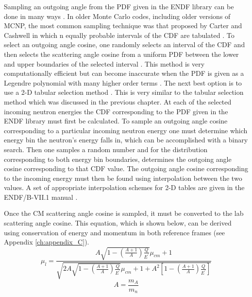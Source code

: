 Sampling an outgoing angle from the PDF given in the ENDF library can be done 
in many ways \citep{lux_monte_1991}. In older Monte Carlo codes, including older
versions of MCNP, the most common sampling technique was that proposed by 
Carter and Cashwell in which n equally probable intervals of the CDF are 
tabulated \citep{l._l._particle-transport_1975}. To select an outgoing angle 
cosine, one randomly selects an interval of the CDF and then selects the 
scattering angle cosine from a uniform PDF between the lower and upper 
boundaries of the selected interval \citep{lux_monte_1991}. This method is very 
computationally efficient but can become inaccurate when the PDF is given as a 
Legendre polynomial with many higher order terms 
\citep{x-5_monte_carlo_team_mcnp_2003}. The next best option is to use a 2-D 
tabular selection method \citep{x-5_monte_carlo_team_mcnp_2003}. This is very
similar to the tabular selection method which was discussed in the previous 
chapter. At each of the selected incoming neutron energies the CDF corresponding
to the PDF given in the ENDF library must first be calculated. To sample an 
outgoing angle cosine corresponding to a particular incoming neutron energy one
must determine which energy bin the neutron's energy falls in, which can be 
accomplished with a binary search. Then one samples a random number and 
for the distribution corresponding to both energy bin boundaries, determines 
the outgoing angle cosine corresponding to that CDF value. The outgoing angle
cosine corresponding to the incoming energy must then be found using
interpolation between the two values. A set of appropriate interpolation schemes
for 2-D tables are given in the ENDF/B-VII.1 manual 
\citep{chadwick_endf/b-vii.1_2011}. 

Once the CM scattering angle cosine is sampled, it must be converted to the 
lab scattering angle cosine. This equation, which is shown below, can be derived
using conservation of energy and momentum in both reference frames (see 
Appendix \ref{ch:appendix_C}).
\begin{equation}
  \mu_{l} = \frac{A\sqrt{1-\left(\frac{A+1}{A}\right)\frac{Q}{E^{'}}}\mu_{cm} + 1}
  {\sqrt{2A\sqrt{1-\left(\frac{A+1}{A}\right)\frac{Q}{E^{'}}}\mu_{cm} + 1 + A^2
        \left[1-\left(\frac{A+1}{A}\right)\frac{Q}{E^{'}}\right]}}
\end{equation}
\begin{equation*}
  A = \frac{m_A}{m_n}
\end{equation*}

